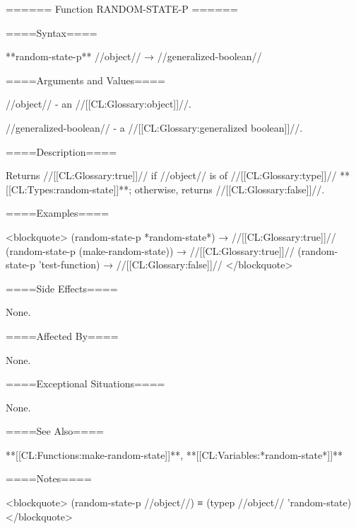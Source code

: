 ====== Function RANDOM-STATE-P ======

====Syntax====

**random-state-p** //object// → //generalized-boolean//

====Arguments and Values====

//object// - an //[[CL:Glossary:object]]//.

//generalized-boolean// - a //[[CL:Glossary:generalized boolean]]//.

====Description====

Returns //[[CL:Glossary:true]]// if //object// is of //[[CL:Glossary:type]]// **[[CL:Types:random-state]]**; otherwise, returns //[[CL:Glossary:false]]//.

====Examples====

<blockquote> (random-state-p *random-state*) → //[[CL:Glossary:true]]// (random-state-p (make-random-state)) → //[[CL:Glossary:true]]// (random-state-p 'test-function) → //[[CL:Glossary:false]]// </blockquote>

====Side Effects====

None.

====Affected By====

None.

====Exceptional Situations====

None.

====See Also====

**[[CL:Functions:make-random-state]]**, **[[CL:Variables:*random-state*]]**

====Notes====

<blockquote> (random-state-p //object//) ≡ (typep //object// 'random-state) </blockquote>

